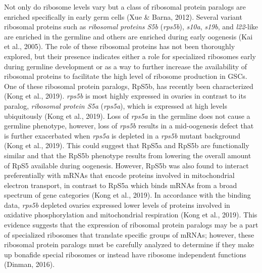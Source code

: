\documentclass[12pt,oneside]{reedthesis}
\begin{document}
Not only do ribosome levels vary but a class of ribosomal protein
paralogs are enriched specifically in early germ cells (Xue \& Barna, 2012).
Several variant ribosomal proteins such as \emph{ribosomal proteins S5b}
(\emph{rps5b}), \emph{s10a}, \emph{s19b}, and \emph{l22}-like are enriched in the germline
and others are enriched during early oogenesis (Kai et al., 2005). The role
of these ribosomal proteins has not been thoroughly explored, but their
presence indicates either a role for specialized ribosomes early during
germline development or as a way to further increase the availability of
ribosomal proteins to facilitate the high level of ribosome production
in GSCs. One of these ribosomal protein paralogs, RpS5b, has recently
been characterized (Kong et al., 2019). \emph{rps5b} is most highly expressed in
ovaries in contrast to its paralog, \emph{ribosomal protein S5a} (\emph{rps5a}),
which is expressed at high levels ubiquitously (Kong et al., 2019). Loss of
\emph{rps5a} in the germline does not cause a germline phenotype, however,
loss of \emph{rps5b} results in a mid-oogenesis defect that is further
exacerbated when \emph{rps5a} is depleted in a \emph{rps5b} mutant background
(Kong et al., 2019). This could suggest that RpS5a and RpS5b are functionally
similar and that the RpS5b phenotype results from lowering the overall
amount of RpS5 available during oogenesis. However, RpS5b was also found
to interact preferentially with mRNAs that encode proteins involved in
mitochondrial electron transport, in contrast to RpS5a which binds mRNAs
from a broad spectrum of gene categories (Kong et al., 2019). In accordance
with the binding data, \emph{rps5b} depleted ovaries expressed lower levels
of proteins involved in oxidative phosphorylation and mitochondrial
respiration (Kong et al., 2019). This evidence suggests that the expression
of ribosomal protein paralogs may be a part of specialized ribosomes
that translate specific groups of mRNAs; however, these ribosomal
protein paralogs must be carefully analyzed to determine if they make up
bonafide special ribosomes or instead have ribosome independent
functions (Dinman, 2016).
\end{document}
